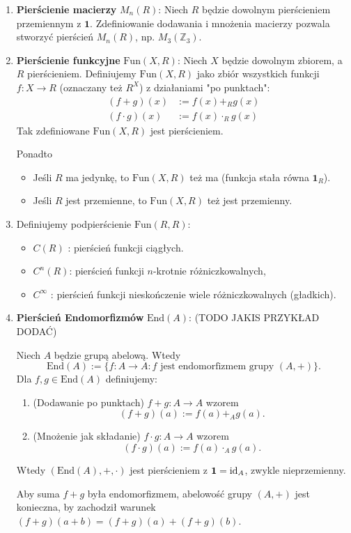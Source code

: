 \begin{enumerate}[label=\arabic*)]
    \item \textbf{Pierścienie macierzy} $M_n(R)$:
Niech $R$ będzie dowolnym pierścieniem przemiennym z $\mathbf{1}$. Zdefiniowanie dodawania i mnożenia macierzy pozwala stworzyć pierścień $M_n(R)$, np. $M_3(\mathbb{Z}_3)$.
    \item \textbf{Pierścienie funkcyjne} $\text{Fun}(X, R)$:
    Niech $X$ będzie dowolnym zbiorem, a $R$ pierścieniem. Definiujemy $\text{Fun}\left( X, R \right) $ jako zbiór wszystkich funkcji $f: X \to R$ (oznaczany też $R^X$) z działaniami "po punktach":
    \begin{align*}
        (f+g)(x) &:= f(x) +_R g(x) \\
        (f \cdot g)(x) &:= f(x) \cdot_R g(x)
    \end{align*}
    Tak zdefiniowane $\text{Fun}\left( X, R \right) $ jest pierścieniem.

    Ponadto
    \begin{itemize}
        \item Jeśli $R$ ma jedynkę, to $\text{Fun}(X,R)$ też ma (funkcja stała równa $\mathbf{1}_R$).
	\item Jeśli $R$ jest przemienne, to $\text{Fun}\left( X, R \right) $ też jest przemienny.
    \end{itemize}
    \item Definiujemy podpierścienie $\text{Fun}\left( R, R \right)$:
		\begin{itemize}
			\item $C\left( R \right) $ : pierścień funkcji ciągłych.
			\item $C^{n}\left( R \right)$: pierścień funkcji $n$-krotnie różniczkowalnych,
			\item $C^{\infty}$ : pierścień funkcji nieskończenie wiele różniczkowalnych (gładkich).
		\end{itemize}
    \item \textbf{Pierścień Endomorfizmów} $\text{End}(A)$: (TODO JAKIS PRZYKŁAD DODAĆ)
	
	    Niech $A$ będzie grupą abelową. Wtedy
		\[
		\text{End}\left( A \right) := \{f: A \to A: f \text{ jest endomorfizmem grupy }\left( A,+ \right) \}
		.\] 
		Dla $f,g \in \text{End}\left( A \right) $ definiujemy:
		\begin{enumerate}[label=\roman*)]
			\item (Dodawanie po punktach) $f+g: A \to A$ wzorem
				\[
					\left( f+g \right) \left( a \right) := f\left( a \right) +_{\scriptscriptstyle A} g\left( a \right) 
				.\]
		        \item (Mnożenie jak składanie) $f\cdot g: A \to A$ wzorem
				\[
					\left( f\cdot g \right)\left( a \right) := f\left( a \right) \cdot_{\scriptscriptstyle A} g\left( a \right) 
				.\] 
		\end{enumerate}
		Wtedy $\left( \text{End}\left( A \right), +, \cdot  \right) $ jest pierścieniem z $\mathbf{1}=\operatorname{id}_{A}$, zwykle nieprzemienny.
		\begin{remark}[Po co abelowość $A$?]
		 Aby suma $f+g$ była endomorfizmem, abelowość grupy $(A, +)$ jest konieczna, by zachodził warunek $(f+g)(a+b) = (f+g)(a) + (f+g)(b)$.


\end{remark}
\end{enumerate}
